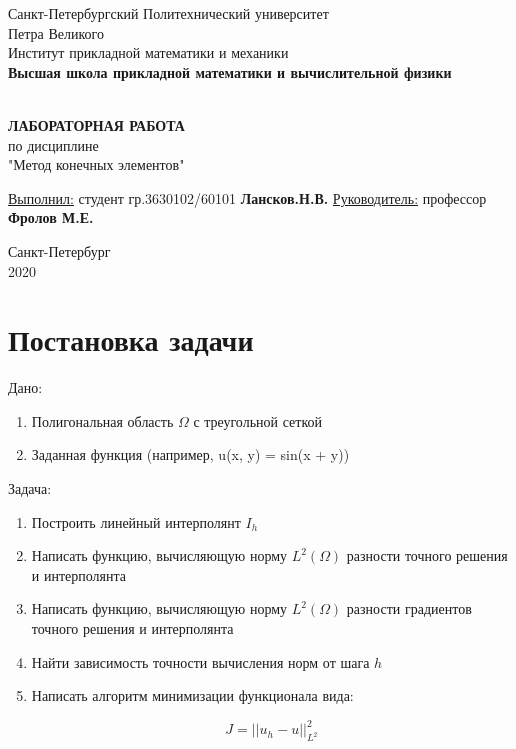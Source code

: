 \documentclass[12pt]{article}
\renewcommand{\listoffigures}{\begingroup  %
\tocsection
\tocfile{\listfigurename}{lof}
\endgroup}
\renewcommand{\listoftables}{\begingroup  %
\tocsection
\tocfile{\listtablename}{lot}
\endgroup}
\begin{document}
\begin{titlepage}
	\center
		Санкт-Петербургский Политехнический 
		университет \\ Петра Великого\\
		Институт прикладной математики и механики
		\\ \textbf{Высшая школа прикладной математики и вычислительной физики}

	\vfill ~
	\textbf{
		\\ \large ЛАБОРАТОРНАЯ РАБОТА
	}
	\\ по дисциплине
	\\ "Метод конечных элементов"
	\vfill ~
    
    
    \begin{flushleft}
    \underline{Выполнил:}  \hspace{\fill} студент гр.3630102/60101 \textbf{Лансков.Н.В.} \linebreak[2]
	\underline{Руководитель:} \hspace{\fill} профессор \textbf{Фролов М.Е.} \\ 
    \end{flushleft}
    

\vfill

{\large}	Санкт-Петербург
\\ 2020
\end{titlepage}


\tableofcontents
\pagebreak


\section{Постановка задачи}

\quad  Дано:
\begin{enumerate}
\item Полигональная область $\Omega$ с треугольной сеткой
\item Заданная функция (например, u(x, y) = sin(x + y))
\end{enumerate} 

Задача:

\begin{enumerate}
\item Построить линейный интерполянт $I_h$
\item Написать функцию, вычисляющую норму $L^2(\Omega)$ разности точного решения и интерполянта
\item Написать функцию, вычисляющую норму $L^2(\Omega)$ разности градиентов точного решения и интерполянта 
\item Найти зависимость точности вычисления норм от шага $h$
\item Написать алгоритм минимизации функционала вида:

\begin{equation}
J = ||u_h - u||_{L^2}^2
\end{equation}

\end{enumerate} 
\end{document}
